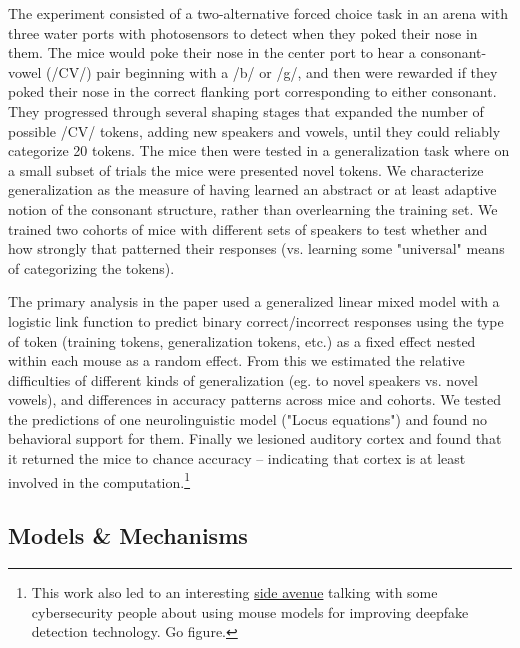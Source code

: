 \begin{done}
The experiment consisted of a two-alternative forced choice task in an arena with three water ports with photosensors to detect when they poked their nose in them. The mice would poke their nose in the center port to hear a consonant-vowel (/CV/) pair beginning with a /b/ or /g/, and then were rewarded if they poked their nose in the correct flanking port corresponding to either consonant. They progressed through several shaping stages that expanded the number of possible /CV/ tokens, adding new speakers and vowels, until they could reliably categorize 20 tokens. The mice then were tested in a generalization task where on a small subset of trials the mice were presented novel tokens. We characterize generalization as the measure of having learned an abstract or at least adaptive notion of the consonant structure, rather than overlearning the training set. We trained two cohorts of mice with different sets of speakers to test whether and how strongly that patterned their responses (vs. learning some "universal" means of categorizing the tokens).

The primary analysis in the paper used a generalized linear mixed model with a logistic link function to predict binary correct/incorrect responses using the type of token (training tokens, generalization tokens, etc.) as a fixed effect nested within each mouse as a random effect. From this we estimated the relative difficulties of different kinds of generalization (eg. to novel speakers vs. novel vowels), and differences in accuracy patterns across mice and cohorts. We tested the predictions of one neurolinguistic model ("Locus equations") and found no behavioral support for them. Finally we lesioned auditory cortex and found that it returned the mice to chance accuracy -- indicating that cortex is at least involved in the computation.\footnote{This work also led to an interesting \href{https://www.blackhat.com/us-19/briefings/schedule/\#detecting-deep-fakes-with-mice-14467}{side avenue} talking with some cybersecurity people about using mouse models for improving deepfake detection technology. Go figure.}
\end{done}

\subsection{Models \& Mechanisms}

